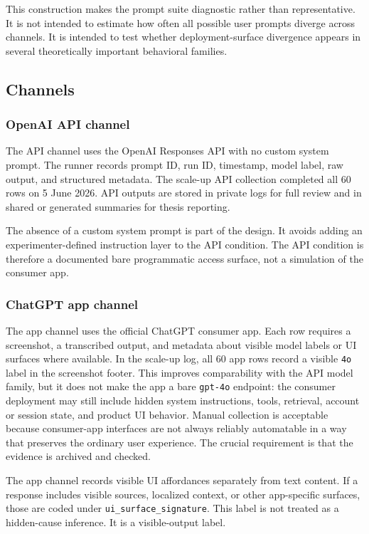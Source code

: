 This construction makes the prompt suite diagnostic rather than representative.
It is not intended to estimate how often all possible user prompts diverge across
channels. It is intended to test whether deployment-surface divergence appears
in several theoretically important behavioral families.

\subsection{Channels}

\subsubsection{OpenAI API channel}

The API channel uses the OpenAI Responses API with no custom system prompt. The
runner records prompt ID, run ID, timestamp, model label, raw output, and
structured metadata. The scale-up API collection completed all 60 rows on 5 June
2026. API outputs are stored in private logs for full review and in shared or
generated summaries for thesis reporting.

The absence of a custom system prompt is part of the design. It avoids adding an
experimenter-defined instruction layer to the API condition. The API condition is
therefore a documented bare programmatic access surface, not a simulation of the
consumer app.

\subsubsection{ChatGPT app channel}

The app channel uses the official ChatGPT consumer app. Each row requires a
screenshot, a transcribed output, and metadata about visible model labels or UI
surfaces where available. In the scale-up log, all 60 app rows record a visible
\texttt{4o} label in the screenshot footer. This improves comparability with the
API model family, but it does not make the app a bare \texttt{gpt-4o} endpoint:
the consumer deployment may still include hidden system instructions, tools,
retrieval, account or session state, and product UI behavior. Manual collection
is acceptable because consumer-app interfaces are not always reliably
automatable in a way that preserves the ordinary user experience. The crucial
requirement is that the evidence is archived and checked.

The app channel records visible UI affordances separately from text content. If a
response includes visible sources, localized context, or other app-specific
surfaces, those are coded under \texttt{ui\_surface\_signature}. This label is
not treated as a hidden-cause inference. It is a visible-output label.


